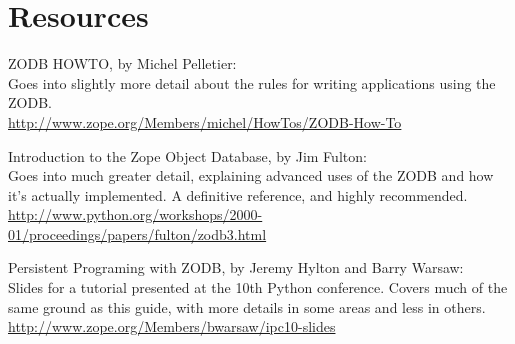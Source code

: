 
\section{Resources}

ZODB HOWTO, by Michel Pelletier:
\\
Goes into slightly more detail about the rules for writing applications using the ZODB.
\\
\url{http://www.zope.org/Members/michel/HowTos/ZODB-How-To}


Introduction to the Zope Object Database, by Jim Fulton:
\\
Goes into much greater detail, explaining advanced uses of the ZODB and 
how it's actually implemented.  A definitive reference, and highly recommended.
\\
\url{http://www.python.org/workshops/2000-01/proceedings/papers/fulton/zodb3.html}

Persistent Programing with ZODB, by Jeremy Hylton and Barry Warsaw:
\\
Slides for a tutorial presented at the 10th Python conference.  Covers
much of the same ground as this guide, with more details in some areas
and less in others.
\\
\url{http://www.zope.org/Members/bwarsaw/ipc10-slides}


